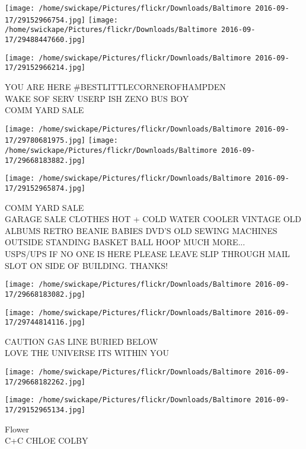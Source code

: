 \documentclass[10pt,letterpaper]{article}
\begin{document}
\texttt{[image: /home/swickape/Pictures/flickr/Downloads/Baltimore 2016-09-17/29152966754.jpg]}
\texttt{[image: /home/swickape/Pictures/flickr/Downloads/Baltimore 2016-09-17/29488447660.jpg]}

\vspace{0.25in}
\texttt{[image: /home/swickape/Pictures/flickr/Downloads/Baltimore 2016-09-17/29152966214.jpg]}

YOU ARE HERE \#BESTLITTLECORNEROFHAMPDEN\\
WAKE SOF SERV USERP ISH ZENO BUS  BOY\\
COMM YARD SALE\\
\pagebreak

\texttt{[image: /home/swickape/Pictures/flickr/Downloads/Baltimore 2016-09-17/29780681975.jpg]}
\texttt{[image: /home/swickape/Pictures/flickr/Downloads/Baltimore 2016-09-17/29668183882.jpg]}

\texttt{[image: /home/swickape/Pictures/flickr/Downloads/Baltimore 2016-09-17/29152965874.jpg]}

COMM YARD SALE\\
GARAGE SALE CLOTHES HOT + COLD WATER COOLER VINTAGE OLD ALBUMS RETRO BEANIE BABIES DVD'S OLD SEWING MACHINES OUTSIDE STANDING BASKET BALL HOOP MUCH MORE...\\
USPS/UPS IF NO ONE IS HERE PLEASE LEAVE SLIP THROUGH MAIL SLOT ON SIDE OF BUILDING.  THANKS!\\
\pagebreak

\texttt{[image: /home/swickape/Pictures/flickr/Downloads/Baltimore 2016-09-17/29668183082.jpg]}

\vspace{0.25in}
\texttt{[image: /home/swickape/Pictures/flickr/Downloads/Baltimore 2016-09-17/29744814116.jpg]}

CAUTION GAS LINE BURIED BELOW\\
LOVE THE UNIVERSE ITS WITHIN YOU\\
\pagebreak

\texttt{[image: /home/swickape/Pictures/flickr/Downloads/Baltimore 2016-09-17/29668182262.jpg]}

\vspace{0.25in}
\texttt{[image: /home/swickape/Pictures/flickr/Downloads/Baltimore 2016-09-17/29152965134.jpg]}

Flower\\
C+C CHLOE COLBY\\
\pagebreak
\end{document}
